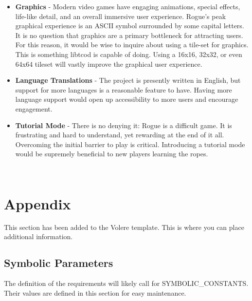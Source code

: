 \documentclass[12pt, titlepage]{article}
\begin{document}
		\begin{itemize}
			\item \textbf{Graphics} - Modern video games have engaging animations, special effects, life-like detail, and an overall immersive user experience. Rogue's peak graphical experience is an ASCII symbol surrounded by some capital letters. It is no question that graphics are a primary bottleneck for attracting users. For this reason, it would be wise to inquire about using a tile-set for graphics. This is something libtcod is capable of doing. Using a 16x16, 32x32, or even 64x64 tileset will vastly improve the graphical user experience.

			\item \textbf{Language Translations} - The project is presently written in English, but support for more languages is a reasonable feature to have. Having more language support would open up accessibility to more users and encourage engagement.

			\item \textbf{Tutorial Mode} - There is no denying it: Rogue is a difficult game. It is frustrating and hard to understand, yet rewarding at the end of it all. Overcoming the initial barrier to play is critical. Introducing a tutorial mode would be supremely beneficial to new players learning the ropes.
		\end{itemize}

\newpage

\





\newpage

\section{Appendix}

This section has been added to the Volere template.  This is where you can place
additional information.

	\subsection{Symbolic Parameters}

	The definition of the requirements will likely call for SYMBOLIC\_CONSTANTS.
	Their values are defined in this section for easy maintenance.
\end{document}
